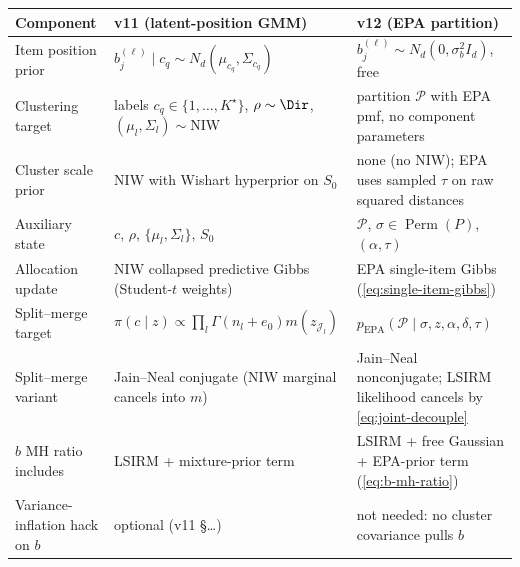 \documentclass[11pt]{article}
\DeclareMathOperator{\EPA}{EPA}
\DeclareMathOperator{\Perm}{Perm}
\begin{document}
\begin{center}
\begin{tabular}{p{} p{} p{}}
\toprule
Component & v11 (latent-position GMM) & v12 (EPA partition) \\
\midrule
Item position prior &
$b_j^{(\ell)}\mid c_q\sim N_d(\mu_{c_q},\Sigma_{c_q})$ &
$b_j^{(\ell)}\sim N_d(0,\sigma_b^2 I_d)$, free \\
Clustering target &
labels $c_q\in\{1,\dots,K^\star\}$, $\rho\sim\Dir$, $(\mu_l,\Sigma_l)\sim$NIW &
partition $\mathcal{P}$ with EPA pmf, no component parameters \\
Cluster scale prior &
NIW with Wishart hyperprior on $S_0$ &
none (no NIW); EPA uses sampled $\tau$ on raw squared distances \\
Auxiliary state &
$c$, $\rho$, $\{\mu_l,\Sigma_l\}$, $S_0$ &
$\mathcal{P}$, $\sigma\in\Perm(P)$, $(\alpha,\tau)$ \\
Allocation update &
NIW collapsed predictive Gibbs (Student-$t$ weights) &
EPA single-item Gibbs (\ref{eq:single-item-gibbs}) \\
Split--merge target &
$\pi(c\mid z)\propto\prod_l\Gamma(n_l+e_0)m(z_{\mathcal{J}_l})$ &
$p_{\EPA}(\mathcal{P}\mid\sigma,z,\alpha,\delta,\tau)$ \\
Split--merge variant &
Jain--Neal conjugate (NIW marginal cancels into $m$) &
Jain--Neal nonconjugate; LSIRM likelihood cancels by \eqref{eq:joint-decouple} \\
$b$ MH ratio includes &
LSIRM + mixture-prior term &
LSIRM + free Gaussian + EPA-prior term (\ref{eq:b-mh-ratio}) \\
Variance-inflation hack on $b$ &
optional (v11 §\ldots) &
not needed: no cluster covariance pulls $b$ \\
\bottomrule
\end{tabular}
\end{center}
\end{document}
